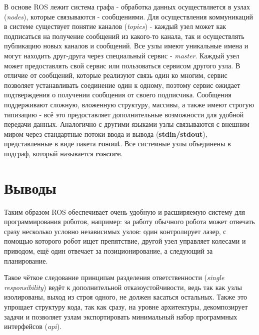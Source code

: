 В основе ROS лежит система графа - обработка данных осуществляется в узлах (\textit{nodes}), которые связываются  - сообщениями. Для осуществления коммуникаций в системе существует понятие каналов (\textit{topics}) - каждый узел может как подписаться на получение сообщений из какого-то канала, так и осуществлять публикацию новых каналов и сообщений. Все узлы имеют уникальные имена и могут находить друг-друга через специальный сервис - \textit{master}. Каждый узел может предоставлять свой сервис или пользоваться сервисом другого узла. В отличие от сообщений, которые реализуют связь один ко многим, сервис позволяет устанавливать соединение один к одному, поэтому сервис ожидает подтверждения о получении сообщения от своего подписчика. Сообщения поддерживают сложную, вложенную структуру, массивы, а также имеют строгую типизацию - всё это предоставляет дополнительные возможности для удобной передачи данных. Аналогично с другими языками узлы связываются с внешним миром через стандартные потоки ввода и вывода (\textbf{stdin/stdout}), представленные в виде пакета \textbf{rosout}. Все системные узлы объединены в подграф, который называется \textbf{roscore}.

\section{Выводы}

Таким образом ROS обеспечивает очень удобную и расширяемую систему для программирования роботов, например: за работу обычного робота может отвечать сразу несколько условно независимых узлов: один контролирует лазер, с помощью которого робот ищет препятствие, другой узел управляет колесами и приводом, ещё один отвечает за позиционирование, а следующий за планирование.

Такое чёткое следование принципам разделения ответственности (\textit{single responsibility}) ведёт к дополнительной отказоустойчивости, ведь так как узлы изолированы, выход из строя одного, не должен касаться остальных. Также это упрощает структуру кода, так как сразу, на уровне архитектуры, декомпозирует задачи и позволяет узлам экспортировать минимальный набор программных интерфейсов (\textit{api}).

